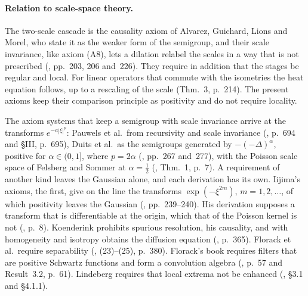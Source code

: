 \paragraph{Relation to scale-space theory.} The two-scale cascade is the causality axiom of
Alvarez, Guichard, Lions and Morel, who state it as the weaker form of the semigroup, and their
scale invariance, like axiom (A8), lets a dilation relabel the scales in a way that is not
prescribed (, pp.~203, 206 and~226). They require in addition that the
stages be regular and local. For linear operators that commute with the isometries the heat
equation follows, up to a rescaling of the scale (Thm.~3, p.~214). The present axioms keep their
comparison principle as positivity and do not require locality.

The axiom systems that keep a semigroup with scale invariance arrive at the transforms
$e^{-a|\xi|^p}$: Pauwels et al.\ from recursivity and scale invariance
(, p.~694 and \S III, p.~695), Duits et al.\ as the semigroups
generated by $-(-\Delta)^\alpha$, positive for $\alpha \in (0,1]$, where $p = 2\alpha$
(, pp.~267 and~277), with the Poisson scale space of Felsberg and
Sommer at $\alpha = \tfrac12$ (, Thm.~1, p.~7). A requirement of
another kind leaves the Gaussian alone, and each derivation has its own. Iijima's axioms, the
first, give on the line the transforms $\exp(-\xi^{2m})$, $m = 1, 2, \dots$, of which
positivity leaves the Gaussian (, pp.~239--240). His derivation
supposes a transform that is differentiable at the origin, which that of the Poisson kernel is
not (, p.~8). Koenderink prohibits spurious resolution, his
causality, and with homogeneity and isotropy obtains the diffusion equation
(, p.~365). Florack et al.\ require separability
(, (23)--(25), p.~380). Florack's book requires filters that are positive
Schwartz functions and form a convolution algebra (, p.~57 and
Result~3.2, p.~61). Lindeberg requires that local extrema not be enhanced
(, \S3.1 and \S4.1.1).


